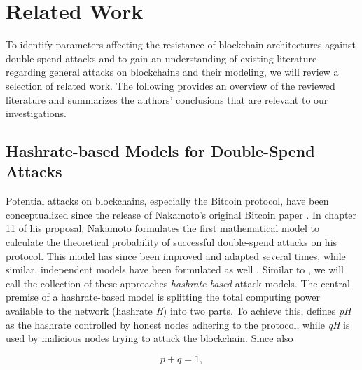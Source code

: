 \documentclass[a4paper,12pt,twoside]{report}
\begin{document}

\chapter{Related Work} \label{relatedwork}
To identify parameters affecting the resistance of blockchain architectures against double-spend attacks and to gain an understanding of existing literature regarding general attacks on blockchains and their modeling, we will review a selection of related work. The following provides an overview of the reviewed literature and summarizes the authors' conclusions that are relevant to our investigations.
\section{Hashrate-based Models for Double-Spend Attacks}
\begin{sloppypar}
Potential attacks on blockchains, especially the Bitcoin protocol, have been conceptualized since the release of Nakamoto's original Bitcoin paper \cite{nakamoto2008bitcoin}. In chapter 11 of his proposal, Nakamoto formulates the first mathematical model to calculate the theoretical probability of successful double-spend attacks on his protocol. This model has since been improved and adapted several times, while similar, independent models have been formulated as well \cite{HBDSA,DSAwithTime,NakamotoDSACorrection,NakamotoExplMCSim}. Similar to \cite{DSAwithTime}, we will call the collection of these approaches \textit{hashrate-based} attack models. The central premise of a hashrate-based model is splitting the total computing power available to the network (hashrate \textit{H}) into two parts. To achieve this, \cite{HBDSA} defines \textit{pH} as the hashrate controlled by honest nodes adhering to the protocol, while \textit{qH} is used by malicious nodes trying to attack the blockchain. Since also\end{sloppypar}
\begin{equation}
p + q = 1,
\end{equation}
\end{document}
